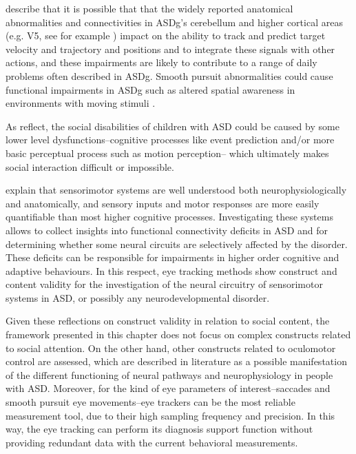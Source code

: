 \cite{johnson2016review} describe that it is possible that that the widely reported anatomical abnormalities and connectivities in ASDg’s cerebellum and higher cortical areas (e.g. V5, see for example \citealp{takarae2014motionprocessing}) impact on the ability to track and predict target velocity and trajectory and positions and to integrate these signals with other actions, and these impairments are likely to contribute to a range of daily problems often described in ASDg. Smooth pursuit abnormalities could cause functional impairments in ASDg such as altered spatial awareness in environments with moving stimuli \citep{wilkes2015oculomotor}. 

As \cite{vonhofsten2009lookingevents} reflect, the social disabilities of children with ASD could be caused by some lower level dysfunctions–cognitive processes like event prediction and/or more basic perceptual process such as motion perception– which ultimately makes social interaction difficult or impossible.

\cite{takarae2004smoothpursuit} explain that sensorimotor systems are well understood both neurophysiologically and anatomically, and sensory inputs and motor responses are more easily quantifiable than most higher cognitive processes. Investigating these systems allows to collect insights into functional connectivity deficits in ASD and for determining whether some neural circuits are selectively affected by the disorder. These deficits can be responsible for impairments in higher order cognitive and adaptive behaviours. In this respect, eye tracking methods show construct and content validity for the investigation of the neural circuitry of sensorimotor systems in ASD, or possibly any neurodevelopmental disorder.

Given these reflections on construct validity in relation to social content, the framework presented in this chapter does not focus on complex constructs related to social attention. On the other hand, other constructs related to oculomotor control are assessed, which are described in literature as a possible manifestation of the different functioning of neural pathways and neurophysiology in people with ASD. Moreover, for the kind of eye parameters of interest–saccades and smooth pursuit eye movements–eye trackers can be the most reliable measurement tool, due to their high sampling frequency and precision. In this way, the eye tracking can perform its diagnosis support function without providing redundant data with the current behavioral measurements.
